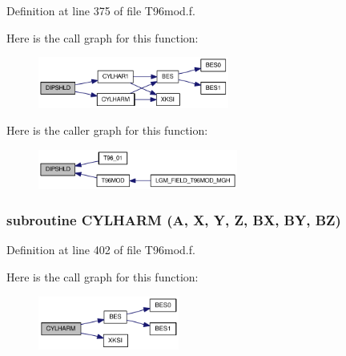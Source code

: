 Definition at line 375 of file T96mod.f.

Here is the call graph for this function:\nopagebreak
\begin{figure}[H]
\begin{center}
\leavevmode
\includegraphics[width=178pt]{_t96mod_8f_22b5155440601bb1258e41b0407b707f_cgraph}
\end{center}
\end{figure}


Here is the caller graph for this function:\nopagebreak
\begin{figure}[H]
\begin{center}
\leavevmode
\includegraphics[width=186pt]{_t96mod_8f_22b5155440601bb1258e41b0407b707f_icgraph}
\end{center}
\end{figure}
\hypertarget{_t96mod_8f_a1021262eae38287e65bc7ff696f67a2}{
\subsubsection[{CYLHARM}]{\setlength{\rightskip}{0pt plus 5cm}subroutine CYLHARM (A, \/  X, \/  Y, \/  Z, \/  BX, \/  BY, \/  BZ)}}
\label{_t96mod_8f_a1021262eae38287e65bc7ff696f67a2}




Definition at line 402 of file T96mod.f.

Here is the call graph for this function:\nopagebreak
\begin{figure}[H]
\begin{center}
\leavevmode
\includegraphics[width=131pt]{_t96mod_8f_a1021262eae38287e65bc7ff696f67a2_cgraph}
\end{center}
\end{figure}



